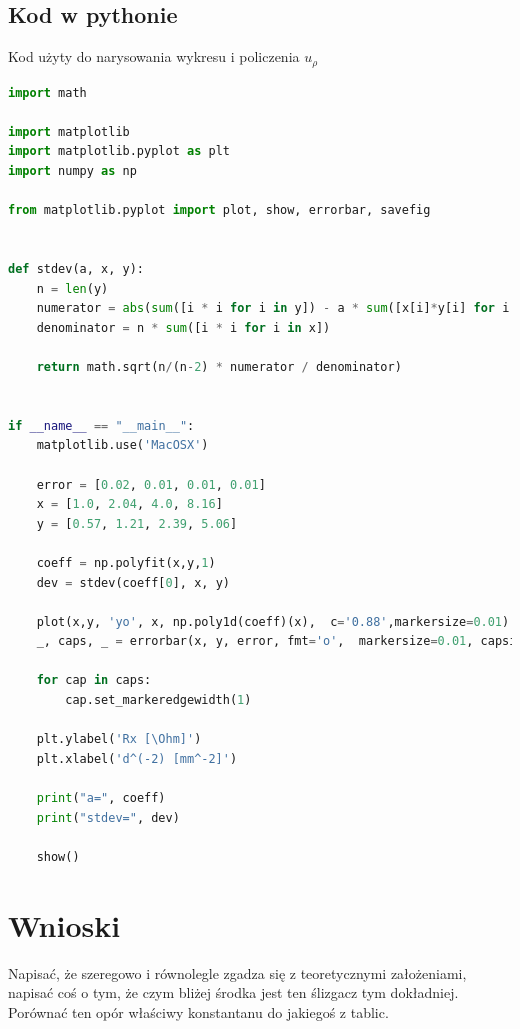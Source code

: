 \documentclass{article}
\begin{document}
\subsection{Kod w pythonie}
Kod użyty do narysowania wykresu i policzenia $u_\rho$
\begin{lstlisting}[language=Python]
import math

import matplotlib
import matplotlib.pyplot as plt
import numpy as np

from matplotlib.pyplot import plot, show, errorbar, savefig


def stdev(a, x, y): 
    n = len(y)
    numerator = abs(sum([i * i for i in y]) - a * sum([x[i]*y[i] for i in range(n)]))
    denominator = n * sum([i * i for i in x])

    return math.sqrt(n/(n-2) * numerator / denominator)


if __name__ == "__main__":
    matplotlib.use('MacOSX')

    error = [0.02, 0.01, 0.01, 0.01]
    x = [1.0, 2.04, 4.0, 8.16]
    y = [0.57, 1.21, 2.39, 5.06]

    coeff = np.polyfit(x,y,1)
    dev = stdev(coeff[0], x, y)

    plot(x,y, 'yo', x, np.poly1d(coeff)(x),  c='0.88',markersize=0.01)
    _, caps, _ = errorbar(x, y, error, fmt='o',  markersize=0.01, capsize=1)

    for cap in caps:
        cap.set_markeredgewidth(1)

    plt.ylabel('Rx [\Ohm]')
    plt.xlabel('d^(-2) [mm^-2]')

    print("a=", coeff)
    print("stdev=", dev)

    show()

\end{lstlisting}


\section{Wnioski}
Napisać, że szeregowo i równolegle zgadza się z teoretycznymi założeniami, napisać coś o tym, że
czym bliżej środka jest ten ślizgacz tym dokładniej. Porównać ten opór właściwy konstantanu do jakiegoś z tablic.
\end{document}
